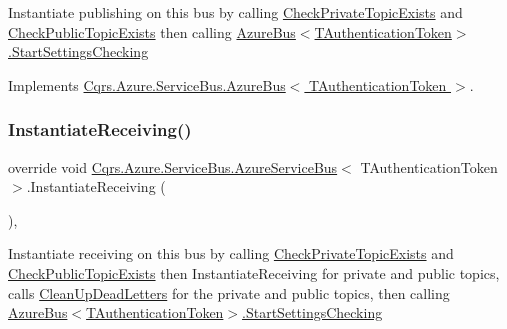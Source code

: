 Instantiate publishing on this bus by calling \hyperlink{classCqrs_1_1Azure_1_1ServiceBus_1_1AzureServiceBus_add2d99ff99f1af5470082b1de340c04a_add2d99ff99f1af5470082b1de340c04a}{Check\+Private\+Topic\+Exists} and \hyperlink{classCqrs_1_1Azure_1_1ServiceBus_1_1AzureServiceBus_aae464d1d93ae6600ff5ace028160dd3c_aae464d1d93ae6600ff5ace028160dd3c}{Check\+Public\+Topic\+Exists} then calling \hyperlink{classCqrs_1_1Azure_1_1ServiceBus_1_1AzureBus_acb7f47329c17646805545e78d0776efe_acb7f47329c17646805545e78d0776efe}{Azure\+Bus$<$\+T\+Authentication\+Token$>$.\+Start\+Settings\+Checking} 



Implements \hyperlink{classCqrs_1_1Azure_1_1ServiceBus_1_1AzureBus_a0bacaa4619921333da4a27371c1d6d0a_a0bacaa4619921333da4a27371c1d6d0a}{Cqrs.\+Azure.\+Service\+Bus.\+Azure\+Bus$<$ T\+Authentication\+Token $>$}.

\mbox{\label{classCqrs_1_1Azure_1_1ServiceBus_1_1AzureServiceBus_ad49a2d063279ec98443e7f1d69178cfa_ad49a2d063279ec98443e7f1d69178cfa}} 
\subsubsection{\texorpdfstring{Instantiate\+Receiving()}{InstantiateReceiving()}\hspace{0.1cm}{\footnotesize\ttfamily [1/2]}}
{\footnotesize\ttfamily override void \hyperlink{classCqrs_1_1Azure_1_1ServiceBus_1_1AzureServiceBus}{Cqrs.\+Azure.\+Service\+Bus.\+Azure\+Service\+Bus}$<$ T\+Authentication\+Token $>$.Instantiate\+Receiving (\begin{DoxyParamCaption}{ }\end{DoxyParamCaption})\hspace{0.3cm}{\ttfamily [protected]}, {\ttfamily [virtual]}}



Instantiate receiving on this bus by calling \hyperlink{classCqrs_1_1Azure_1_1ServiceBus_1_1AzureServiceBus_add2d99ff99f1af5470082b1de340c04a_add2d99ff99f1af5470082b1de340c04a}{Check\+Private\+Topic\+Exists} and \hyperlink{classCqrs_1_1Azure_1_1ServiceBus_1_1AzureServiceBus_aae464d1d93ae6600ff5ace028160dd3c_aae464d1d93ae6600ff5ace028160dd3c}{Check\+Public\+Topic\+Exists} then Instantiate\+Receiving for private and public topics, calls \hyperlink{classCqrs_1_1Azure_1_1ServiceBus_1_1AzureServiceBus_a8d1d5833d49b7793933825f2a13fb8b7_a8d1d5833d49b7793933825f2a13fb8b7}{Clean\+Up\+Dead\+Letters} for the private and public topics, then calling \hyperlink{classCqrs_1_1Azure_1_1ServiceBus_1_1AzureBus_acb7f47329c17646805545e78d0776efe_acb7f47329c17646805545e78d0776efe}{Azure\+Bus$<$\+T\+Authentication\+Token$>$.\+Start\+Settings\+Checking} 



